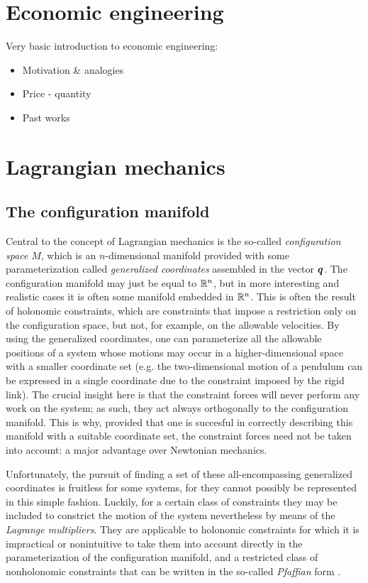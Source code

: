 \section{Economic engineering}
Very basic introduction to economic engineering:
\begin{itemize}
    \item Motivation \& analogies
    \item Price - quantity
    \item Past works
\end{itemize}

\section{Lagrangian mechanics}
\subsection{The configuration manifold}
Central to the concept of Lagrangian mechanics is the so-called \emph{configuration space} \(M\), which is an \(n\)-dimensional manifold provided with some parameterization called \emph{generalized coordinates} assembled in the vector \(\vb*{q}\). 
The configuration manifold may just be equal to \(\mathbb{R}^n\), but in more interesting and realistic cases it is often some manifold embedded in \(\mathbb{R}^n\). This is often the result of holonomic constraints, which are constraints that impose a restriction only on the configuration space, but not, for example, on the allowable velocities.
By using the generalized coordinates, one can parameterize all the allowable positions of a system whose motions may occur in a higher-dimensional space with a smaller coordinate set (e.g. the two-dimensional motion of a pendulum can be expressed in a single coordinate due to the constraint imposed by the rigid link).  The crucial insight here is that the constraint forces will never perform any work on the system; as such, they act always orthogonally to the configuration manifold. This is why, provided that one is succesful in correctly describing this manifold with a suitable coordinate set, the constraint forces need not be taken into account: a  major advantage over Newtonian mechanics. 

Unfortunately, the pursuit of finding a set of these all-encompassing generalized coordinates is fruitless for some systems, for they cannot possibly be represented in this simple fashion. Luckily, for a certain class of constraints they may be included to constrict the motion of the system nevertheless by means of the \emph{Lagrange multipliers}. They are applicable to holonomic constraints for which it is impractical or nonintuitive to take them into account directly in the parameterization of the configuration manifold, and a restricted class of nonholonomic constraints that can be written in the so-called \emph{Pfaffian} form \cite{Bullo2005}.


